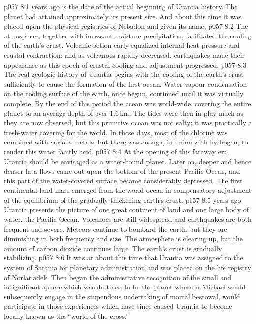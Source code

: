 \vs p057 8:1  years ago is the date of the actual beginning of Urantia history. The planet had attained approximately its present size. And about this time it was placed upon the physical registries of Nebadon and given its name, 
\vs p057 8:2 The atmosphere, together with incessant moisture precipitation, facilitated the cooling of the earth’s crust. Volcanic action early equalized internal\hyp{}heat pressure and crustal contraction; and as volcanoes rapidly decreased, earthquakes made their appearance as this epoch of crustal cooling and adjustment progressed.
\vs p057 8:3 The real geologic history of Urantia begins with the cooling of the earth’s crust sufficiently to cause the formation of the first ocean. Water\hyp{}vapour condensation on the cooling surface of the earth, once begun, continued until it was virtually complete. By the end of this period the ocean was world\hyp{}wide, covering the entire planet to an average depth of over 1.6\,km. The tides were then in play much as they are now observed, but this primitive ocean was not salty; it was practically a fresh\hyp{}water covering for the world. In those days, most of the chlorine was combined with various metals, but there was enough, in union with hydrogen, to render this water faintly acid.
\vs p057 8:4 At the opening of this faraway era, Urantia should be envisaged as a water\hyp{}bound planet. Later on, deeper and hence denser lava flows came out upon the bottom of the present Pacific Ocean, and this part of the water\hyp{}covered surface became considerably depressed. The first continental land mass emerged from the world ocean in compensatory adjustment of the equilibrium of the gradually thickening earth’s crust.
\vs p057 8:5 \pc {} years ago Urantia presents the picture of one great continent of land and one large body of water, the Pacific Ocean. Volcanoes are still widespread and earthquakes are both frequent and severe. Meteors continue to bombard the earth, but they are diminishing in both frequency and size. The atmosphere is clearing up, but the amount of carbon dioxide continues large. The earth’s crust is gradually stabilizing.
\vs p057 8:6 It was at about this time that Urantia was assigned to the system of Satania for planetary administration and was placed on the life registry of Norlatiadek. Then began the administrative recognition of the small and insignificant sphere which was destined to be the planet whereon Michael would subsequently engage in the stupendous undertaking of mortal bestowal, would participate in those experiences which have since caused Urantia to become locally known as the “world of the cross.”

